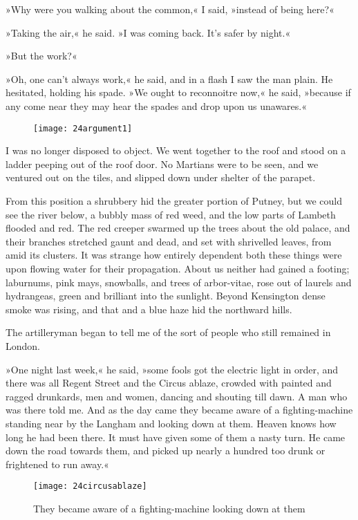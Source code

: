 »Why were you walking about the common,« I said, »instead of being here?«

»Taking the air,« he said. »I was coming back. It's safer by night.«

»But the work?«

»Oh, one can't always work,« he said, and in a flash I saw the man plain. He hesitated, holding his spade. »We ought to reconnoitre now,« he said, »because if any come near they may hear the spades and drop upon us unawares.«

\begin{figure}[tb]
\centering
\texttt{[image: 24argument1]}
\end{figure}

I was no longer disposed to object. We went together to the roof and stood on a ladder peeping out of the roof door. No Martians were to be seen, and we ventured out on the tiles, and slipped down under shelter of the parapet.

From this position a shrubbery hid the greater portion of Putney, but we could see the river below, a bubbly mass of red weed, and the low parts of Lambeth flooded and red. The red creeper swarmed up the trees about the old palace, and their branches stretched gaunt and dead, and set with shrivelled leaves, from amid its clusters. It was strange how entirely dependent both these things were upon flowing water for their propagation. About us neither had gained a footing; laburnums, pink mays, snowballs, and trees of arbor-vitae, rose out of laurels and hydrangeas, green and brilliant into the sunlight. Beyond Kensington dense smoke was rising, and that and a blue haze hid the northward hills.

The artilleryman began to tell me of the sort of people who still remained in London.

»One night last week,« he said, »some fools got the electric light in order, and there was all Regent Street and the Circus ablaze, crowded with painted and ragged drunkards, men and women, dancing and shouting till dawn. A man who was there told me. And as the day came they became aware of a fighting-machine standing near by the Langham and looking down at them. Heaven knows how long he had been there. It must have given some of them a nasty turn. He came down the road towards them, and picked up nearly a hundred too drunk or frightened to run away.«

\begin{figure}[tbp]
\centering
\texttt{[image: 24circusablaze]}
\caption{They became aware of a fighting-machine looking down at them}
\end{figure}

